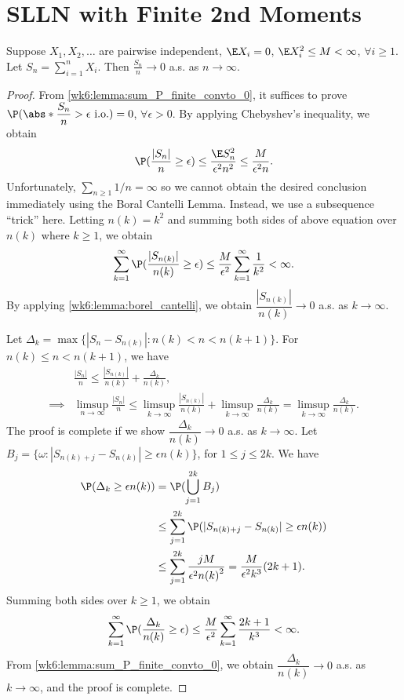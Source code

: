 \documentclass[../aipt.tex]{subfiles}
\begin{document}
\section{SLLN with Finite 2nd Moments}
\begin{Lemma}\label{wk6:lemma:SLLN_2nd_moments}
Suppose $X_1, X_2, \ldots$ are pairwise independent, $\E X_i = 0$, $\E X_i^2 \leq M < \infty$, $\forall i \geq 1$. Let $S_n = \sum_{i=1}^n X_i$. Then $\frac{S_n}{n} \to 0$ a.s. as $n \to \infty$.
\end{Lemma}
\begin{proof}
From \cref{wk6:lemma:sum_P_finite_convto_0}, it suffices to prove $\P(\abs*{\dfrac{S_n}{n}} > \epsilon \io) = 0$, $\forall \epsilon > 0$.
By applying Chebyshev's inequality, we obtain
\begin{align*}
\P(\frac{|S_n|}{n} \geq \epsilon) \leq \frac{\E S_n^2}{\epsilon^2 n^2} \leq \frac{M}{\epsilon^2 n}.
\end{align*}
Unfortunately, $\sum_{n\geq1} 1/n = \infty$ so we cannot obtain the desired conclusion immediately using the Boral Cantelli Lemma. Instead, we use a subsequence ``trick'' here. Letting $n(k) = k^2$ and summing both sides of above equation over $n(k)$ where $k \geq 1$, we obtain
\begin{align*}
\sum_{k=1}^{\infty} \P(\frac{|S_{n(k)}|}{n(k)} \geq \epsilon) 
\leq \frac{M}{\epsilon^2} \sum_{k=1}^{\infty} \frac{1}{k^2} < \infty.
\end{align*}
By applying \cref{wk6:lemma:borel_cantelli}, we obtain $\dfrac{|S_{n(k)}|}{n(k)} \to 0$ a.s. as $k \to \infty$.

Let $\Delta_k = \max \big\{|S_n - S_{n(k)}|: n(k) < n < n(k+1)\big\}$. For $n(k) \leq n < n(k+1)$, we have
\begin{align*}
&\frac{|S_n|}{n} \leq \frac{|S_{n(k)}|}{n(k)} + \frac{\Delta_k}{n(k)}, \\
\implies
&\limsup_{n \to \infty}\frac{|S_n|}{n} \leq \limsup_{k \to \infty}\frac{|S_{n(k)}|}{n(k)} + \limsup_{k \to \infty}\frac{\Delta_k}{n(k)} = \limsup_{k \to \infty}\frac{\Delta_k}{n(k)}.
\end{align*}
The proof is complete if we show $\dfrac{\Delta_k}{n(k)} \to 0$ a.s. as $k \to \infty$. Let $B_j = \big\{\omega: |S_{n(k)+j} - S_{n(k)}| \geq \epsilon n(k)\big\}$, for $1 \leq j \leq 2k$. We have
\begin{align*}
\P(\Delta_k \geq \epsilon n(k)) 
&= \P(\bigcup_{j=1}^{2k} B_j)\\
&\leq \sum_{j=1}^{2k} \P(|S_{n(k)+j} - S_{n(k)}| \geq \epsilon n(k)) \\
&\leq \sum_{j=1}^{2k} \frac{jM}{\epsilon^2 {n(k)}^2}
= \frac{M}{\epsilon^2 k^3} (2k +1).
\end{align*}
Summing both sides over $k \geq 1$, we obtain
\begin{align*}
\sum_{k=1}^{\infty} \P(\frac{\Delta_k}{n(k)} \geq \epsilon)
\leq \frac{M}{\epsilon^2} \sum_{k=1}^{\infty} \frac{2k +1}{k^3} < \infty.
\end{align*}
From \cref{wk6:lemma:sum_P_finite_convto_0}, we obtain $\dfrac{\Delta_k}{n(k)} \to 0$ a.s. as $k \to \infty$, and the proof is complete.
\end{proof}
\end{document}
